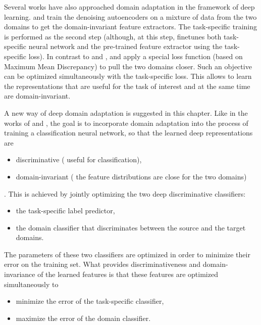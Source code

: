 Several works have also approached domain adaptation in the framework of deep learning. \cite{glorot2011domain} and \cite{chopra2013dlid} train the denoising autoencoders on a mixture of data from the two domains to get the domain-invariant feature extractors. The task-specific training is performed as the second step (although, at this step, \cite{chopra2013dlid} finetunes both task-specific neural network and the pre-trained feature extractor using the task-specific loss). In contrast to \cite{glorot2011domain} and \cite{chopra2013dlid}, \cite{LongC0J15} and \cite{tzeng2014deep} apply a special loss function (based on Maximum Mean Discrepancy) to pull the two domains closer. Such an objective can be optimized simultaneously with the task-specific loss. This allows to learn the representations that are useful for the task of interest and at the same time are domain-invariant.

A new way of deep domain adaptation is suggested in this chapter. Like in the works of \cite{LongC0J15} and \cite{tzeng2014deep}, the goal is to incorporate domain adaptation into the process of training a classification neural network, so that the learned deep representations are 
\begin{itemize}
    \item discriminative (\ie{} useful for classification),
    \item  domain-invariant (\ie{} the feature distributions are close for the two domains)
\end{itemize}. 
 This is achieved by jointly optimizing the two deep discriminative classifiers:  \begin{itemize}
     \item the task-specific label predictor,
     \item the domain classifier that discriminates between the source and the target domains.
 \end{itemize}
The parameters of these two classifiers are optimized in order to minimize their error on the training set. What provides discriminativeness and domain-invariance of the learned features is that these features are optimized simultaneously to 
\begin{itemize} 
    \item minimize the error of the task-specific classifier, 
    \item maximize the error of the domain classifier. 
 \end{itemize}

